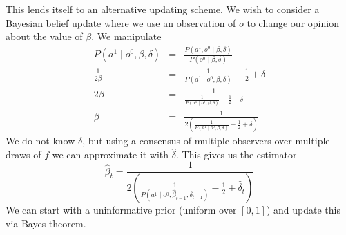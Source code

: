 \documentclass{amsart}
\theoremstyle{plain}
\numberwithin{equation}{section}
\begin{document}
This lends itself to an alternative updating scheme. We wish to consider a
Bayesian belief update where we use an observation of $o$ to change our
opinion about the value of $\beta $. We manipulate%
\begin{eqnarray*}
P\left( a^{1}\mid o^{0},\beta ,\delta \right)  &=&\frac{P\left(
a^{1},o^{0}\mid \beta ,\delta \right) }{P\left( o^{0}\mid \beta ,\delta
\right) } \\
\frac{1}{2\beta } &=&\frac{1}{P\left( a^{1}\mid o^{0},\beta ,\delta \right) }%
-\frac{1}{2}+\delta  \\
2\beta  &=&\frac{1}{\frac{1}{P\left( a^{1}\mid o^{0},\beta ,\delta \right) }-%
\frac{1}{2}+\delta } \\
\beta  &=&\frac{1}{2\left( \frac{1}{P\left( a^{1}\mid o^{0},\beta ,\delta
\right) }-\frac{1}{2}+\delta \right) }
\end{eqnarray*}%
We do not know $\delta $, but using a consensus of multiple observers over
multiple draws of $f$ we can approximate it with $\hat{\delta}$. This gives
us the estimator%
\begin{equation*}
\hat{\beta}_{t}=\frac{1}{2\left( \frac{1}{P\left( a^{1}\mid o^{0},\hat{\beta}%
_{t-1},\hat{\delta}_{t-1}\right) }-\frac{1}{2}+\hat{\delta}_{t}\right) }
\end{equation*}%
We can start with a uninformative prior (uniform over $\left[ 0,1\right] $)
and update this via Bayes theorem.

%
\end{document}
